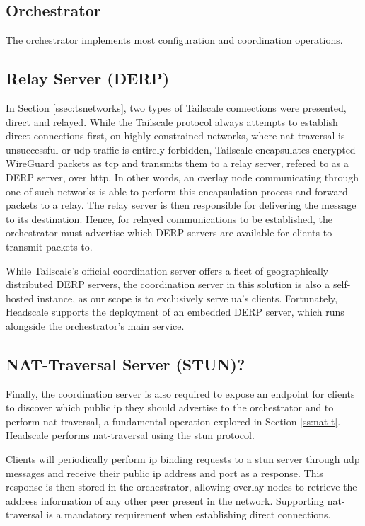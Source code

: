 \documentclass[11pt,twoside,a4paper]{report}
\begin{document}
\subsection{Orchestrator}

The orchestrator implements most configuration and coordination operations.

\subsection{Relay Server (DERP)}

In Section \ref{ssec:tsnetworks}, two types of Tailscale connections were presented, direct and relayed. While the Tailscale protocol always attempts to establish direct connections first, on highly constrained networks, where \ac{nat}-traversal is unsuccessful or \ac{udp} traffic is entirely forbidden, Tailscale encapsulates encrypted WireGuard packets as \ac{tcp} and transmits them to a relay server, refered to as a \ac{DERP} server, over \ac{http}. In other words, an overlay node communicating through one of such networks is able to perform this encapsulation process and forward packets to a relay. The relay server is then responsible for delivering the message to its destination. Hence, for relayed communications to be established, the orchestrator must advertise which \ac{DERP} servers are available for clients to transmit packets to.

While Tailscale's official coordination server offers a fleet of geographically distributed \ac{DERP} servers, the coordination server in this solution is also a self-hosted instance, as our scope is to exclusively serve \ac{ua}'s clients. Fortunately, Headscale supports the deployment of an embedded \ac{DERP} server, which runs alongside the orchestrator's main service.

\subsection{NAT-Traversal Server (STUN)?}

Finally, the coordination server is also required to expose an endpoint for clients to discover which public \ac{ip} they should advertise to the orchestrator and to perform \ac{nat}-traversal, a fundamental operation explored in Section \ref{ss:nat-t}. Headscale performs \ac{nat}-traversal using the \ac{stun} protocol.

Clients will periodically perform \ac{ip} binding requests to a \ac{stun} server through \ac{udp} messages and receive their public \ac{ip} address and port as a response. This response is then stored in the orchestrator, allowing overlay nodes to retrieve the address information of any other peer present in the network. Supporting \ac{nat}-traversal is a mandatory requirement when establishing direct connections.
\end{document}
